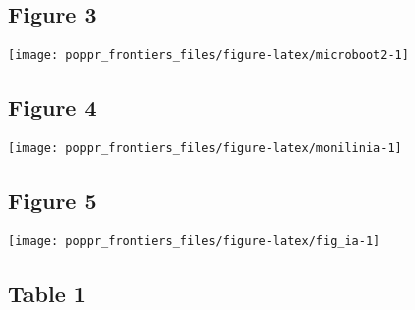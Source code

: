 \documentclass{frontiersSCNS} %
\newenvironment{CodeChunk}{}{}
\begin{document}
\subsection*{Figure 3}\label{figure-3}

\begin{CodeChunk}

\texttt{[image: poppr\_frontiers\_files/figure-latex/microboot2-1]} \end{CodeChunk}

\subsection*{Figure 4}\label{figure-4}

\begin{CodeChunk}

\texttt{[image: poppr\_frontiers\_files/figure-latex/monilinia-1]} \end{CodeChunk}

\subsection*{Figure 5}\label{figure-5}

\begin{CodeChunk}

\texttt{[image: poppr\_frontiers\_files/figure-latex/fig\_ia-1]} \end{CodeChunk}

\subsection*{Table 1}\label{table-1}
\end{document}
